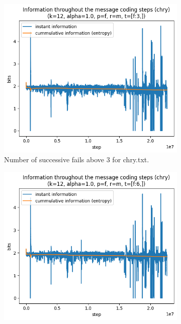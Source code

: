 \documentclass{article}
\begin{document}
\begin{figure}
    \begin{subfigure}[b]{0.3\textwidth}
        \begin{center}
            \includegraphics[width=1.0\linewidth]{../scripts/images/chry_12_1.0_f_m_[f:3,].png}
        \end{center}
        \caption{Number of successive fails above 3 for chry.txt.}
        \label{fig:results-threshold-f-3}
    \end{subfigure}
    \hfill
    \begin{subfigure}[b]{0.3\textwidth}
        \begin{center}
            \includegraphics[width=1.0\linewidth]{../scripts/images/chry_12_1.0_f_m_[f:6,].png}

\end{center}
\end{subfigure}
\end{figure}
\end{document}
